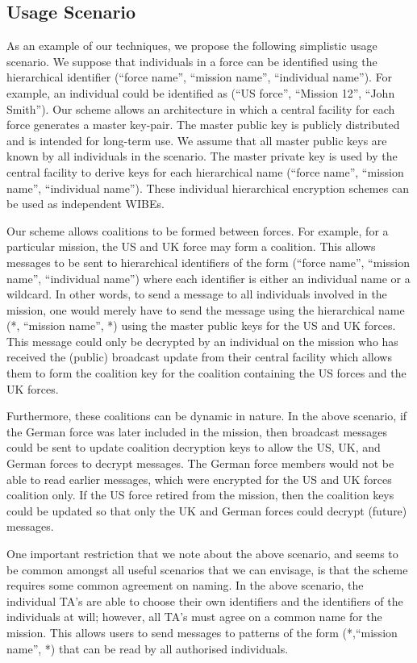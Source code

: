 \documentclass{IEEEtran}
\begin{document}
\subsection{Usage Scenario}

As an example of our techniques, we propose the following simplistic
usage scenario. We suppose that individuals in a force can be
identified using the hierarchical identifier (``force name'',
``mission name'', ``individual name''). For example, an individual
could be identified as (``US force'', ``Mission 12'', ``John
Smith''). Our scheme allows an architecture in which a central
facility for each force generates a master key-pair. The master
public key is publicly distributed and is intended for long-term
use. We assume that all master public keys are known by all
individuals in the scenario. The master private key is used by the
central facility to derive keys for each hierarchical name (``force
name'', ``mission name'', ``individual name''). These individual
hierarchical encryption schemes can be used as independent WIBEs.

Our scheme allows coalitions to be formed between forces. For
example, for a particular mission, the US and UK force may form a
coalition. This allows messages to be sent to hierarchical
identifiers of the form (``force name'', ``mission name'',
``individual name'') where each identifier is either an individual
name or a wildcard. In other words, to send a message to all
individuals involved in the mission, one would merely have to send
the message using the hierarchical name (*, ``mission name'',
*) using the master public keys for the US and UK forces. This
message could only be decrypted by an individual on the mission who
has received the (public) broadcast update from their central
facility which allows them to form the coalition key for the
coalition containing the US forces and the UK forces.

Furthermore, these coalitions can be dynamic in nature. In the above
scenario, if the German force was later included in the mission,
then broadcast messages could be sent to update coalition decryption
keys to allow the US, UK, and German forces to decrypt messages. The
German force members would not be able to read earlier messages,
which were encrypted for the US and UK forces coalition only. If the
US force retired from the mission, then the coalition keys could be
updated so that only the UK and German forces could decrypt (future)
messages.

One important restriction that we note about the above scenario, and
seems to be common amongst all useful scenarios that we can
envisage, is that the scheme requires some common agreement on
naming. In the above scenario, the individual TA's are able to
choose their own identifiers and the identifiers of the individuals
at will; however, all TA's must agree on a common name for the
mission. This allows users to send messages to patterns of the form
(*,``mission name'', *) that can be read by all authorised
individuals.
\end{document}

